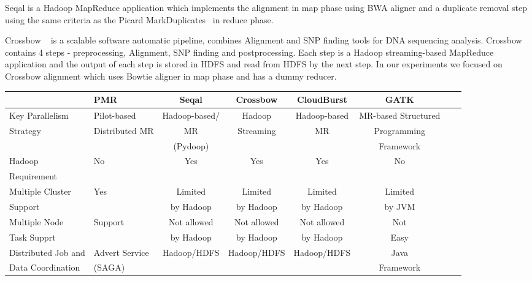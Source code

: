 \documentclass{acm_proc_article-sp}
\begin{document}
Seqal is a Hadoop MapReduce application which implements the alignment
in map phase using BWA aligner and a duplicate removal step using the same criteria as the Picard
MarkDuplicates~\cite{seal2011,seal_2011_mapred} in reduce phase. 

Crossbow ~\cite{langmead2009} is a scalable software automatic pipeline, combines Alignment and SNP finding tools for DNA sequencing analysis.
Crossbow contains 4 steps - preprocessing, Alignment, SNP finding and postprocessing.  Each step is a Hadoop streaming-based MapReduce application and the output of each step is stored in HDFS and read from HDFS by the next step.  In our experiments we focused on Crossbow alignment which uses Bowtie aligner in map phase and has a dummy reducer.  


\begin{center}
\begin{table}[ht]
{\small
\hfill{}
\begin{tabular}{|l|l|c|c|c|c|c|c|}
\hline
  &\centering \textbf{PMR}\cite{pmr2012} & \textbf{Seqal}\cite{seal2011} & \textbf{Crossbow}\cite{langmead2009} & \textbf{CloudBurst}\cite{cloudburst} & \textbf{GATK}\cite{gatk} \\ \hline
 \hline 
 Key Parallelism   & Pilot-based   &  Hadoop-based/  &  Hadoop   & Hadoop-based & MR-based Structured \\ 
Strategy  & Distributed MR & MR  & Streaming  & MR & Programming  \\
& & (Pydoop) &  & & Framework \\ \hline
  
Hadoop & No & Yes & Yes\footnote[1] & Yes & No \\ 
Requirement  & & & &  &\\ \hline  
    
Multiple  Cluster & Yes  & Limited   & Limited  & Limited  & Limited \\
Support &  & by Hadoop &  by Hadoop & by Hadoop  & by JVM   \\ \hline

Multiple Node & Support & Not allowed  & Not allowed  & Not allowed & Not  \\
Task Supprt &  & by Hadoop & by Hadoop & by Hadoop & Easy  \\ \hline
Distributed Job and  & Advert Service  & Hadoop/HDFS & Hadoop/HDFS & Hadoop/HDFS & Java \\ 
Data Coordination &(SAGA) &  & & & Framework\\ \hline



\end{tabular}}
\end{table}
\end{center}
\end{document}
